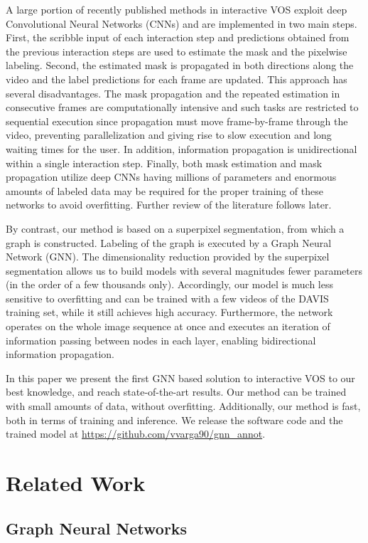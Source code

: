 \documentclass[conference]{IEEEtran}
\begin{document}
A large portion of recently published methods in interactive VOS exploit deep Convolutional Neural Networks (CNNs) and are implemented in two main steps. First, the scribble input of each interaction step and predictions obtained from the previous interaction steps are used to estimate the mask and the pixelwise labeling. Second, the estimated mask is propagated in both directions along the video and the label predictions for each frame are updated. This approach has several disadvantages. The mask propagation and the repeated estimation in consecutive frames are computationally intensive and such tasks are restricted to sequential execution since propagation must move frame-by-frame through the video, preventing parallelization and giving rise to slow execution and long waiting times for the user. In addition, information propagation is unidirectional within a single interaction step. Finally, both mask estimation and mask propagation utilize deep CNNs having millions of parameters and enormous amounts of labeled data may be required for the proper training of these networks to avoid overfitting. Further review of the literature follows later.

By contrast, our method is based on a superpixel segmentation, from which a graph is constructed. Labeling of the graph is executed by a Graph Neural Network (GNN). The dimensionality reduction provided by the superpixel segmentation allows us to build models with several magnitudes fewer parameters (in the order of a few thousands only). Accordingly, our model is much less sensitive to overfitting and can be trained with a few videos of the DAVIS training set, while it still achieves high accuracy. Furthermore, the network operates on the whole image sequence at once and executes an iteration of information passing between nodes in each layer, enabling bidirectional information propagation.

In this paper we present the first GNN based solution to interactive VOS to our best knowledge, and reach state-of-the-art results. Our method can be trained with small amounts of data, without overfitting. Additionally, our method is fast, both in terms of training and inference. We release the software code and the trained model at \url{https://github.com/vvarga90/gnn_annot}.

\section{Related Work}

\subsection{Graph Neural Networks}
\end{document}
